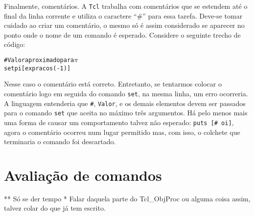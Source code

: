 
Finalmente, comentários. A \texttt{Tcl} trabalha com comentários que
se estendem até o final da linha corrente e utiliza o caractere ``\#''
para essa tarefa. Deve-se tomar cuidado ao criar um comentário, o
mesmo só é assim considerado se aparecer no ponto onde o nome de um
comando é esperado. Considere o seguinte trecho de código:
\begin{alltt}
\# Valor aproximado para \(\pi\)
set pi [expr {acos(-1)}]
\end{alltt}
Nesse caso o comentário está correto. Entretanto, se tentarmos colocar
o comentário logo em seguida do comando \verb!set!, na mesma linha, um erro
ocorreria. A linguagem entenderia que \verb!#!, \verb!Valor!, e os
demais elementos devem ser passados para o comando \verb!set! que
aceita no máximo três argumentos. Há pelo menos mais uma forma de
causar um comportamento talvez não esperado: \verb!puts [# oi]!, agora
o comentário ocorreu num lugar permitido mas, com isso, o colchete que
terminaria o comando foi descartado.




\section{Avaliação de comandos}

** Só se der tempo
* Falar daquela parte do Tcl\_ObjProc ou alguma coisa assim, talvez
colar do que já tem escrito.
